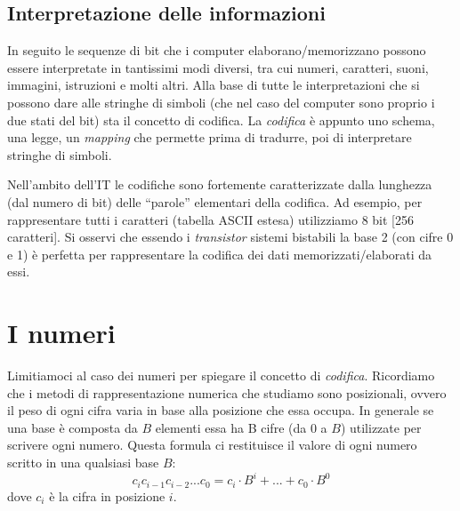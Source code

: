 \documentclass[class=book, crop=false, oneside]{standalone}
\begin{document}
\subsection{Interpretazione delle informazioni} In seguito le sequenze di bit che i computer elaborano/memorizzano possono essere interpretate in tantissimi modi diversi, tra cui numeri, caratteri, suoni, immagini, istruzioni e molti altri. Alla base di tutte le interpretazioni che si possono dare alle stringhe di simboli (che nel caso del computer sono proprio i due stati del bit) sta il concetto di codifica. La \emph{codifica} è appunto uno schema, una legge, un \emph{mapping} che permette prima di tradurre, poi di interpretare stringhe di simboli.

Nell’ambito dell’IT le codifiche sono fortemente caratterizzate dalla lunghezza (dal numero di bit) delle “parole” elementari della codifica. Ad esempio, per rappresentare tutti i caratteri (tabella ASCII estesa) utilizziamo  8 bit [256 caratteri]. Si osservi che essendo i \emph{transistor} sistemi bistabili la base 2 (con cifre 0 e 1) è perfetta per rappresentare la codifica dei dati memorizzati/elaborati da essi.

\section{I numeri}
Limitiamoci al caso dei numeri per spiegare il concetto di \emph{codifica}. Ricordiamo che i metodi di rappresentazione numerica che studiamo sono posizionali, ovvero il peso di ogni cifra varia in base alla posizione che essa occupa. In generale se una base è composta da \(B\) elementi essa ha B cifre (da 0 a \(B\)) utilizzate per scrivere ogni numero. Questa formula ci restituisce il valore di ogni numero scritto in una qualsiasi base \(B\):
\begin{equation*}
	c_{i} c_{i-1} c_{i-2}... c_{0}=c_{i}\cdot B^{i}+...+c_{0}\cdot B^{0}
\end{equation*}
dove \(c_{i}\) è la cifra in posizione \(i\).
\end{document}
